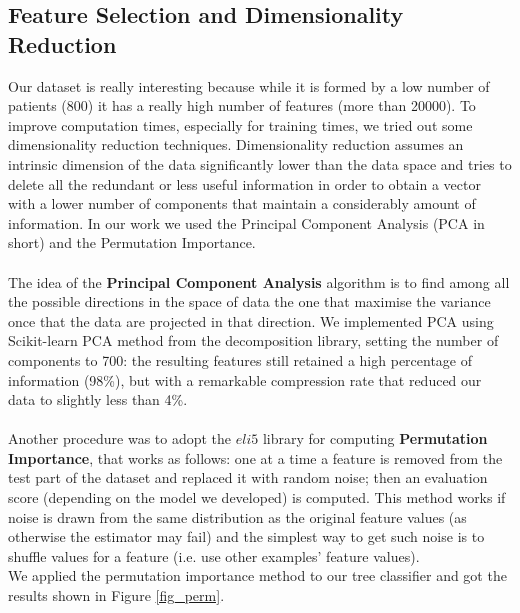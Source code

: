 \documentclass[12pt]{article}
\begin{document}
\subsection{Feature Selection and Dimensionality Reduction}
Our dataset is really interesting because while it is formed by a low number of patients (800) it has a really high number of features (more than 20000). To improve computation times, especially for training times, we tried out some dimensionality reduction techniques. Dimensionality reduction assumes an intrinsic dimension of the data significantly lower than the data space and tries to delete all the redundant or less useful information in order to obtain a vector with a lower number of components that maintain a considerably amount of information. In our work we used the Principal Component Analysis (PCA in short) and the Permutation Importance. \\ \\
The idea of the \textbf{Principal Component Analysis} algorithm is to find among all the possible directions in the space of data the one that maximise the variance once that the data are projected in that direction. We implemented  PCA using Scikit-learn PCA method from the decomposition library, setting the number of components to 700: the resulting features still retained a high percentage of information (98\%), but with a remarkable compression rate that reduced our data to slightly less than 4\%. \\ \\
Another procedure was to adopt the $eli5$ library for computing \textbf{Permutation Importance}, that works as follows:
one at a time a feature is removed from the test part of the dataset and replaced it with random noise; then an evaluation score (depending on the model we developed) is computed. This method works if noise is drawn from the same distribution as the original feature values (as otherwise the estimator may fail) and the simplest way to get such noise is to shuffle values for a feature (i.e. use other examples' feature values). \\
We applied the permutation importance method to our tree classifier and got the results shown in Figure \ref{fig_perm}. \\
\end{document}
